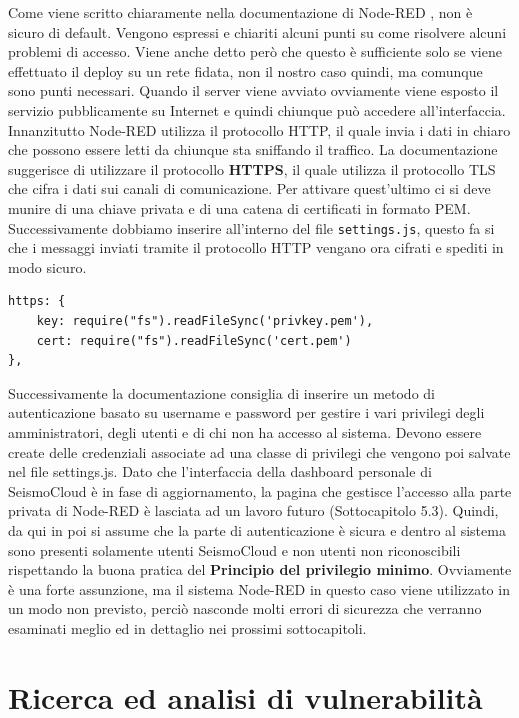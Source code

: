 \documentclass[a4paper,10pt]{memoir}
\begin{document}
Come viene scritto chiaramente nella documentazione di Node-RED \cite{securing}, non è sicuro di default.
Vengono espressi e chiariti alcuni punti su come risolvere alcuni problemi di accesso.
Viene anche detto però che questo è sufficiente solo se viene effettuato il deploy su un rete fidata, non il nostro caso quindi, ma comunque sono punti necessari.
Quando il server viene avviato ovviamente viene esposto il servizio pubblicamente su Internet e quindi chiunque può accedere all'interfaccia.
Innanzitutto Node-RED utilizza il protocollo HTTP, il quale invia i dati in chiaro che possono essere letti da chiunque sta sniffando il traffico.
La documentazione suggerisce di utilizzare il protocollo \textbf{HTTPS}, il quale utilizza il protocollo TLS che cifra i dati sui canali di comunicazione.
Per attivare quest'ultimo ci si deve munire di una chiave privata e di una catena di certificati in formato PEM.
Successivamente dobbiamo inserire all'interno del file \texttt{settings.js}, questo fa si che i messaggi inviati tramite il protocollo HTTP vengano ora cifrati e spediti in modo sicuro.
\begin{lstlisting}
https: {
    key: require("fs").readFileSync('privkey.pem'),
    cert: require("fs").readFileSync('cert.pem')
},
\end{lstlisting}

Successivamente la documentazione consiglia di inserire un metodo di autenticazione basato su username e password per gestire i vari privilegi degli amministratori, degli utenti e di chi non ha accesso al sistema.
Devono essere create delle credenziali associate ad una classe di privilegi che vengono poi salvate nel file settings.js.
Dato che l'interfaccia della dashboard personale di SeismoCloud è in fase di aggiornamento, la pagina che gestisce l'accesso alla parte privata di Node-RED è lasciata ad un lavoro futuro (Sottocapitolo 5.3).
Quindi, da qui in poi si assume che la parte di autenticazione è sicura e dentro al sistema sono presenti solamente utenti SeismoCloud e non utenti non riconoscibili rispettando la buona pratica del \textbf{Principio del privilegio minimo}. Ovviamente è una forte assunzione, ma il sistema Node-RED in questo caso viene utilizzato in un modo non previsto, perciò nasconde molti errori di sicurezza che verranno esaminati meglio ed in dettaglio nei prossimi sottocapitoli.

\section{Ricerca ed analisi di vulnerabilità}
\end{document}
